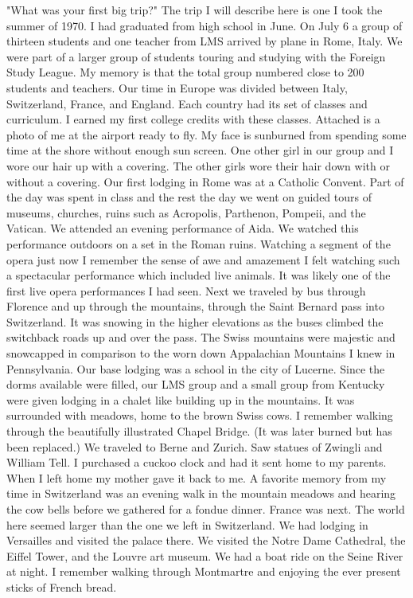 "What was your first big trip?"
The trip I will describe here is one I took the summer of 1970. I had graduated from high school in June.  On July 6 a group of thirteen students and one teacher from LMS arrived by plane in Rome, Italy. We were part of a larger group of students touring and studying with the Foreign Study League. My memory is that the total group numbered close to 200 students and teachers. Our time in Europe was divided between Italy, Switzerland, France, and England. Each country had its set of classes and curriculum. I earned my first college credits with these classes. Attached is a photo of me at the airport ready to fly. My face is sunburned from spending some time at the shore without enough sun screen. One other girl in our group and I wore our hair up with a covering. The other girls wore their hair down with or without a covering. 
Our first lodging in Rome was at a Catholic Convent. Part of the day was spent in class and the rest the day we went on guided tours of museums, churches, ruins such as Acropolis, Parthenon, Pompeii, and the Vatican. We attended an evening performance of Aida. We watched this performance outdoors on a set in the Roman ruins. Watching a segment of the opera just now I remember the sense of awe and amazement I felt watching such a spectacular performance which included live animals. It was likely one of the first live opera performances I had seen. 
Next we traveled by bus through Florence and up through the mountains, through the Saint Bernard pass into Switzerland. It was snowing in the higher elevations as the buses climbed the switchback roads up and over the pass. The Swiss mountains were majestic and snowcapped in comparison to the worn down Appalachian Mountains I knew in Pennsylvania. Our base lodging was a school in the city of Lucerne. Since the dorms available were filled, our LMS group and a small group from Kentucky were given lodging in a chalet like building up in the mountains. It was surrounded with meadows, home to the brown Swiss cows. I remember walking through the beautifully illustrated Chapel Bridge. (It was later burned but has been replaced.) We traveled to Berne and Zurich. Saw statues of Zwingli and William Tell. I purchased a cuckoo clock and had it sent home to my parents. When I left home my mother gave it back to me. A favorite memory from my time in Switzerland was an evening walk in the mountain meadows and hearing the cow bells before we gathered for a fondue dinner. 
France was next. The world here seemed larger than the one we left in Switzerland. We had lodging in Versailles and visited the palace there. We visited the Notre Dame Cathedral, the Eiffel Tower, and the Louvre art museum. We had a boat ride on the Seine River at night. I remember walking through Montmartre and enjoying the ever present sticks of French bread.

